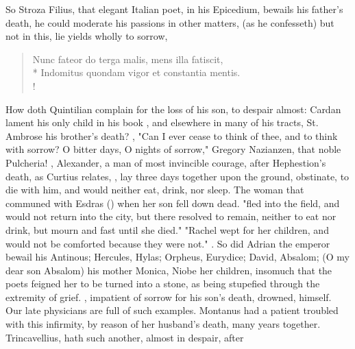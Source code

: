 So Stroza Filius, that elegant Italian poet, in his Epicedium, bewails his
father's death, he could moderate his passions in other matters, (as he
confesseth) but not in this, lie yields wholly to sorrow,

\begin{latin}
\begin{verse}%
Nunc fateor do terga malis, mens illa fatiscit,\\*
Indomitus quondam vigor et constantia mentis.\\!
\end{verse}%
\end{latin}

How doth Quintilian complain for the loss of his son, to
despair almost: Cardan lament his only child in his book
, and elsewhere in many of his tracts,
St. Ambrose his brother's death? ,
\etc{} "Can I ever cease to think of thee, and to think with sorrow? O bitter
days, O nights of sorrow," \etc{} Gregory Nazianzen, that noble Pulcheria!
, \etc{} Alexander, a man of most
invincible courage, after Hephestion's death, as Curtius relates, , lay three days together upon the ground,
obstinate, to die with him, and would neither eat, drink, nor sleep. The woman
that communed with Esdras () when her
son fell down dead. "fled into the field, and would not return into the city,
but there resolved to remain, neither to eat nor drink, but mourn and fast
until she died." "Rachel wept for her children, and would not be comforted
because they were not." . So did Adrian the emperor
bewail his Antinous; Hercules, Hylas; Orpheus, Eurydice; David, Absalom; (O my
dear son Absalom) \Austin{} his mother Monica, Niobe her children, insomuch that
the poets feigned her to be turned into a stone, as being
stupefied through the extremity of grief. , impatient of
sorrow for his son's death, drowned, himself. Our late physicians are full of
such examples. Montanus 
had a patient troubled with this infirmity, by reason of
her husband's death, many years together. Trincavellius,
 hath such another, almost in despair, after
